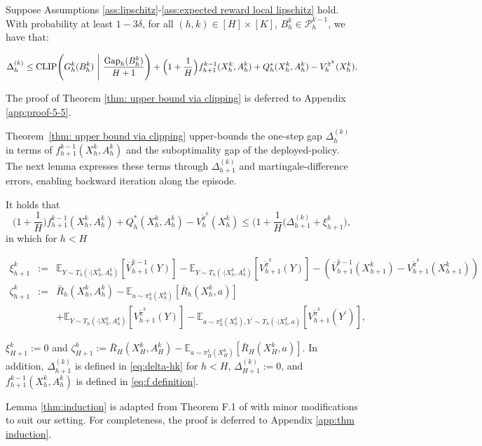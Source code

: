 \documentclass[final,supplement]{siamart251216}
\begin{document}
\begin{theorem}\label{thm: upper bound via clipping}
Suppose Assumptions \ref{ass:lipschitz}-\ref{ass:expected reward local lipschitz} hold. With probability at least $1-3\delta$, for all $ (h,k)\in [H]\times [K]$, $B_h^k\in \mathcal{P}_h^{k-1}$, we have that:


\begin{eqnarray*}
 \Delta_{h}^{(k)}\leq {\rm CLIP}\Bigg( G_{h}^{k}(B_h^k)\,\,\Bigg|\,\,\frac{{\rm Gap}_h(B_h^k)}{H+1}\Bigg)+\Big(1+\frac{1}{H}\Big)f_{h+1}^{k-1}(X_h^k, A_h^k)+Q_h^{*}(X_h^k,A_h^k)-V_h^{\tilde{\pi}^{k}}(X_h^k).
\end{eqnarray*}

\end{theorem}

The proof of Theorem \ref{thm: upper bound via clipping} is deferred to Appendix \ref{app:proof-5-5}.

Theorem~\ref{thm: upper bound via clipping} upper-bounds the one-step gap
$\Delta_h^{(k)}$ in terms of
$f_{h+1}^{k-1}(X_h^k,A_h^k)$ and the suboptimality gap of the deployed-policy. The next
lemma expresses these terms through $\Delta_{h+1}^{(k)}$ and
martingale-difference errors, enabling backward iteration along the episode.


\begin{lemma}\label{thm:induction} It holds that
$$\Big(1+\frac{1}{H}\Big)f_{h+1}^{k-1}(X_h^k, A_h^k)+Q_h^{*}(X_h^k,A_h^k)-V_h^{\tilde{\pi}^{k}}(X_h^k)\leq \Big(1+\frac{1}{H}\Big(\Delta_{h+1}^{(k)}+\xi_{h+1}^{k}\Big),$$
in which for $h<H$

\begin{eqnarray*}
    \xi_{h+1}^{k}&:=&\mathbb{E}_{Y \sim {T}_{h}(\cdot|X_h^k,A_h^k)}[\overline{V}_{h+1}^{k-1}(Y)]-\mathbb{E}_{Y \sim {T}_{h}(\cdot|X_h^k,A_h^k)}[V_{h+1}^{\tilde{\pi}^{k}}(Y)]-(\overline{V}_{h+1}^{k-1}(X_{h+1}^{k})-V_{h+1}^{\tilde{\pi}^{k}}(X_{h+1}^{k}))\\
    \zeta_{h+1}^k&:=&\bar{R}_{h}(X_h^k,A_h^k)-\mathbb{E}_{a\sim \pi_h^k(X_h^k)}[\bar{R}_{h}(X_h^k,a)]\\
    && +\mathbb{E}_{Y \sim {T}_{h}(\cdot|X_h^k,A_h^k)}[V_{h+1}^{\tilde{\pi}^{k}}(Y)]-  \mathbb{E}_{a\sim \pi_h^k(X_h^k), Y^{'} \sim {T}_{h}(\cdot|X_h^k,a)}[V_{h+1}^{\tilde{\pi}^{k}}(Y^{'})],
\end{eqnarray*}

$\xi_{H+1}^{k}:=0$ and $\zeta_{H+1}^{k}:=\bar{R}_{H}(X_H^k,A_H^k)-\mathbb{E}_{a\sim \pi_H^k(X_H^k)}[\bar{R}_{H}(X_H^k,a)]$. In addition, $\Delta_{h+1}^{(k)}$ is defined in \eqref{eq:delta-hk} for $h<H$, $\Delta_{H+1}^{(k)}:=0$,  and $f_{h+1}^{k-1}(X_h^k, A_h^k)$ is defined in \eqref{eq:f definition}.
\end{lemma}
Lemma \ref{thm:induction}  is adapted from Theorem F.1 of \cite{sinclair2023adaptive}  with minor modifications to suit our setting. For completeness, the proof  is deferred to Appendix \ref{app:thm induction}.
\end{document}
